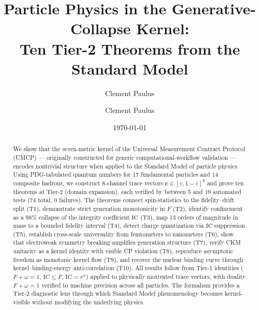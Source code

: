 \documentclass[
  aps,
  prd,
  twocolumn,
  superscriptaddress,
  nofootinbib,
  floatfix
]{revtex4-2}
\newcommand{\eps}{\varepsilon}
\newcommand{\tvec}{\mathbf{c}}
\newcommand{\IC}{\mathrm{IC}}
\begin{document}
\title{Particle Physics in the Generative-Collapse Kernel:\\
Ten Tier-2 Theorems from the Standard Model}

\author{Clement Paulus}

\author{Clement Paulus}

\date{\today}

\begin{abstract}
We show that the seven-metric kernel of the Universal Measurement
Contract Protocol (UMCP) --- originally constructed for generic
computational-workflow validation --- encodes nontrivial structure
when applied to the Standard Model of particle physics.
Using PDG-tabulated quantum numbers for 17 fundamental particles
and 14 composite hadrons, we construct 8-channel trace vectors
$\tvec \in [\eps, 1-\eps]^8$ and prove ten theorems at Tier-2
(domain expansion), each verified by between 5 and 19 automated
tests (74 total, 0 failures).  The theorems connect spin-statistics
to the fidelity--drift split (T1), demonstrate strict generation
monotonicity in $F$ (T2), identify confinement as a 98\% collapse
of the integrity coefficient $\IC$ (T3), map 13 orders of magnitude
in mass to a bounded fidelity interval (T4), detect charge
quantization via $\IC$ suppression (T5), establish cross-scale
universality from femtometers to nanometers (T6), show that
electroweak symmetry breaking amplifies generation structure (T7),
verify CKM unitarity as a kernel identity with visible CP violation
(T8), reproduce asymptotic freedom as monotonic kernel flow (T9),
and recover the nuclear binding curve through kernel--binding-energy
anti-correlation (T10).  All results follow from Tier-1 identities
($F + \omega = 1$, $\IC \leq F$, $\IC = e^{\kappa}$) applied to
physically motivated trace vectors, with duality $F + \omega = 1$
verified to machine precision across all particles.
The formalism provides a Tier-2 diagnostic lens through which
Standard Model phenomenology becomes kernel-visible without
modifying the underlying physics.
\end{abstract}

\maketitle
\end{document}
